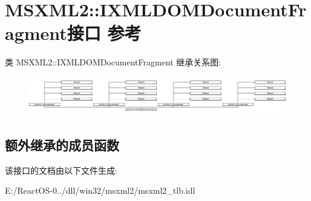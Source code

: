 \hypertarget{interface_m_s_x_m_l2_1_1_i_x_m_l_d_o_m_document_fragment}{}\section{M\+S\+X\+M\+L2\+:\+:I\+X\+M\+L\+D\+O\+M\+Document\+Fragment接口 参考}
\label{interface_m_s_x_m_l2_1_1_i_x_m_l_d_o_m_document_fragment}
类 M\+S\+X\+M\+L2\+:\+:I\+X\+M\+L\+D\+O\+M\+Document\+Fragment 继承关系图\+:\begin{figure}[H]
\begin{center}
\leavevmode
\includegraphics[height=1.693548cm]{interface_m_s_x_m_l2_1_1_i_x_m_l_d_o_m_document_fragment}
\end{center}
\end{figure}
\subsection*{额外继承的成员函数}


该接口的文档由以下文件生成\+:\begin{DoxyCompactItemize}
\item 
E\+:/\+React\+O\+S-\/0../dll/win32/msxml2/msxml2\+\_\+tlb.\+idl\end{DoxyCompactItemize}
